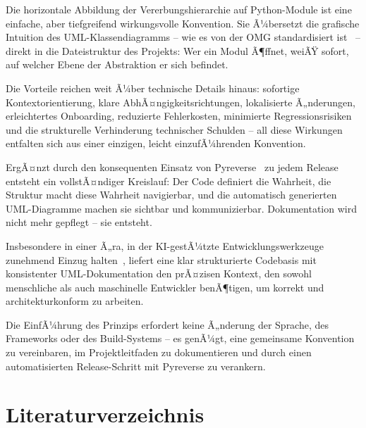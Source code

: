 ﻿\documentclass[a4paper,12pt]{article}
\begin{document}
Die horizontale Abbildung der Vererbungshierarchie auf Python-Module ist eine
einfache, aber tiefgreifend wirkungsvolle Konvention. Sie Ã¼bersetzt die grafische
Intuition des UML-Klassendiagramms -- wie es von der OMG standardisiert
ist~\cite{omg2017} -- direkt in die Dateistruktur des Projekts: Wer ein Modul
Ã¶ffnet, weiÃŸ sofort, auf welcher Ebene der Abstraktion er sich befindet.

Die Vorteile reichen weit Ã¼ber technische Details hinaus: sofortige
Kontextorientierung, klare AbhÃ¤ngigkeitsrichtungen, lokalisierte Ã„nderungen,
erleichtertes Onboarding, reduzierte Fehlerkosten, minimierte Regressionsrisiken
und die strukturelle Verhinderung technischer Schulden -- all diese Wirkungen
entfalten sich aus einer einzigen, leicht einzufÃ¼hrenden Konvention.

ErgÃ¤nzt durch den konsequenten Einsatz von Pyreverse~\cite{pyreverse2024} zu
jedem Release entsteht ein vollstÃ¤ndiger Kreislauf: Der Code definiert die
Wahrheit, die Struktur macht diese Wahrheit navigierbar, und die automatisch
generierten UML-Diagramme machen sie sichtbar und kommunizierbar. Dokumentation
wird nicht mehr gepflegt -- sie entsteht.

Insbesondere in einer Ã„ra, in der KI-gestÃ¼tzte Entwicklungswerkzeuge zunehmend
Einzug halten~\cite{chen2021}, liefert eine klar strukturierte Codebasis mit
konsistenter UML-Dokumentation den prÃ¤zisen Kontext, den sowohl menschliche
als auch maschinelle Entwickler benÃ¶tigen, um korrekt und architekturkonform
zu arbeiten.

\vspace{1em}
\noindent Die EinfÃ¼hrung des Prinzips erfordert keine Ã„nderung der Sprache,
des Frameworks oder des Build-Systems -- es genÃ¼gt, eine gemeinsame Konvention
zu vereinbaren, im Projektleitfaden zu dokumentieren und durch einen automatisierten
Release-Schritt mit Pyreverse zu verankern.

\newpage
\section*{Literaturverzeichnis}
\end{document}
